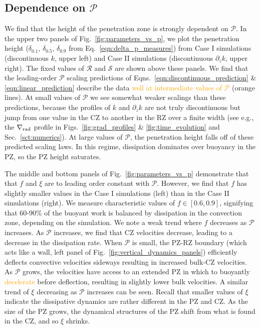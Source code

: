 \documentclass[twocolumn, linenumbers]{aastex631}
\newcommand{\gradrad}{\ensuremath{\nabla_{\rm{rad}}}}
\newcommand{\mP}{\ensuremath{\mathcal{P}}}
\newcommand{\mR}{\ensuremath{\mathcal{R}}}
\newcommand{\mS}{\ensuremath{\mathcal{S}}}
\newcommand{\editone}[1]{\textcolor{orange}{#1}}
\begin{document}
\subsection{Dependence on $\mP$}
We find that the height of the penetration zone is strongly dependent on $\mP$.
In the upper two panels of Fig.~\ref{fig:parameters_vs_p}, we plot the penetration height ($\delta_{0.1}$, $\delta_{0.5}$, $\delta_{0.9}$ from Eq.~\ref{eqn:delta_p_measures}) from Case I simulations (discontinuous $k$, upper left) and Case II simulations (discontinuous $\partial_z k$, upper right).
The fixed values of $\mR$ and $\mS$ are shown above these panels.
We find that the leading-order $\mP$ scaling predictions of Eqns.~\ref{eqn:discontinuous_prediction} \& \ref{eqn:linear_prediction} describe the data \editone{well at intermediate values of $\mP$} (orange lines).
At small values of $\mP$ we see somewhat weaker scalings than these predictions, because the profiles of $k$ and $\partial_z k$ are not truly discontinuous but jump from one value in the CZ to another in the RZ over a finite width (see e.g., the $\gradrad$ profile in Figs.~\ref{fig:grad_profiles} \& \ref{fig:time_evolution} and Sec.~\ref{sct:numerics}).
At large values of $\mP$, the penetration height falls off of these predicted scaling laws.
In this regime, dissipation dominates over buoyancy in the PZ, so the PZ height saturates.

The middle and bottom panels of Fig.~\ref{fig:parameters_vs_p} demonstrate that that $f$ and $\xi$ are to leading order constant with $\mP$.
However, we find that $f$ has slightly smaller values in the Case I simulations (left) than in the Case II simulations (right).
We measure characteristic values of $f \in [0.6, 0.9]$, signifying that 60-90\% of the buoyant work is balanced by dissipation in the convection zone, depending on the simulation.
We note a weak trend where $f$ decreases as $\mP$ increases.
As $\mP$ increases, we find that CZ velocities decrease, leading to a decrease in the dissipation rate.
When $\mP$ is small, the PZ-RZ boundary (which acts like a wall, left panel of Fig.~\ref{fig:vertical_dynamics_panels}) efficiently deflects convective velocities sideways resulting in increased bulk-CZ velocities.
As $\mP$ grows, the velocities have access to an extended PZ in which to buoyantly \editone{decelerate} before deflection, resulting in slightly lower bulk velocities.
A similar trend of $\xi$ decreasing as $\mP$ increases can be seen.
Recall that smaller values of $\xi$ indicate the dissipative dynamics are rather different in the PZ and CZ.
As the size of the PZ grows, the dynamical structures of the PZ shift from what is found in the CZ, and so $\xi$ shrinks.
\end{document}
